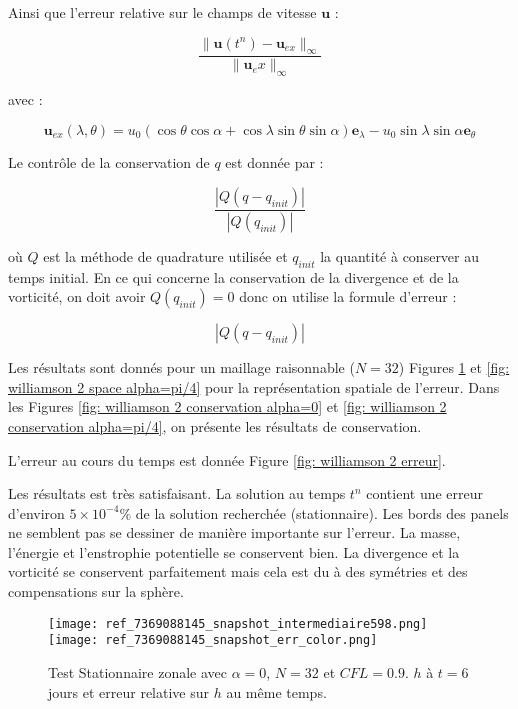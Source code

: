 Ainsi que l'erreur relative sur le champs de vitesse $\mathbf{u}$ : 

\begin{equation}
\dfrac{\| \mathbf{u}(t^n) - \mathbf{u}_{ex}\|_{\infty}}{\| \mathbf{u}_ex \|_\infty}
\end{equation}

avec :

\begin{equation}
\mathbf{u}_{ex}(\lambda, \theta) = u_0 \left( \cos \theta \cos \alpha + \cos \lambda \sin \theta \sin \alpha \right) \mathbf{e}_{\lambda} - u_0 \sin \lambda \sin \alpha \mathbf{e}_{\theta}
\end{equation}

Le contrôle de la conservation de $q$ est donnée par :

\begin{equation}
\dfrac{|Q(q - q_{init})|}{|Q(q_{init})|}
\end{equation}

où $Q$ est la méthode de quadrature utilisée et $q_{init}$ la quantité à conserver au temps initial. En ce qui concerne la conservation de la divergence et de la vorticité, on doit avoir $Q(q_{init})=0$ donc on utilise la formule d'erreur :

\begin{equation}
|Q(q - q_{init})|
\end{equation}

Les résultats sont donnés pour un maillage raisonnable ($N=32$)  Figures \ref{fig: williamson 2 space alpha=0} et \ref{fig: williamson 2 space alpha=pi/4} pour la représentation spatiale de l'erreur. Dans les Figures \ref{fig: williamson 2 conservation alpha=0} et \ref{fig: williamson 2 conservation alpha=pi/4}, on présente les résultats de conservation.

L'erreur au cours du temps est donnée Figure \ref{fig: williamson 2 erreur}.

Les résultats est très satisfaisant. La solution au temps $t^n$ contient une erreur d'environ $5 \times 10^{-4} \%$ de la solution recherchée (stationnaire).
Les bords des panels ne semblent pas se dessiner de manière importante sur l'erreur. 
La masse, l'énergie et l'enstrophie potentielle se conservent bien. La divergence et la vorticité se conservent parfaitement mais cela est du à des symétries et des compensations sur la sphère.

\begin{figure}[htbp]
\begin{center}
\texttt{[image: ref\_7369088145\_snapshot\_intermediaire598.png]}\\
\texttt{[image: ref\_7369088145\_snapshot\_err\_color.png]}
\end{center}
\caption{Test Stationnaire zonale \cite{Williamson1992} avec $\alpha=0$, $N=32$ et $CFL=0.9$. $h$ à $t=6$ jours et erreur relative sur $h$ au même temps.}
\label{fig: williamson 2 space alpha=0}
\end{figure}

